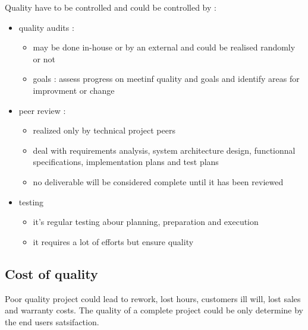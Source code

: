 \documentclass{article}
\begin{document}
Quality have to be controlled and could be controlled by :
\begin{itemize}
    \item quality audits : 
        \begin{itemize}
            \item may be done in-house or by an external and could be realised randomly or not
            \item goals : assess progress on meetinf quality and goals and identify areas for improvment or change
        \end{itemize}
    \item peer review :
        \begin{itemize}
            \item realized only by technical project peers
            \item deal with requirements analysis, system architecture design, functionnal specifications, implementation plans and test plans
            \item no deliverable will be considered complete until it has been reviewed
        \end{itemize}
    \item testing
        \begin{itemize}
            \item it's regular testing abour planning, preparation and execution
            \item it requires a lot of efforts but ensure quality
        \end{itemize}
\end{itemize}

\subsection{Cost of quality}

Poor quality project could lead to rework, lost hours, customers ill will, lost sales and warranty costs.\newline
The quality of a complete project could be only determine by the end users satsifaction.
\end{document}
